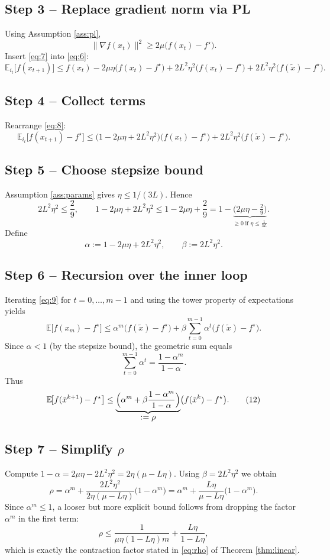 \documentclass[11pt]{article}
\begin{document}
\subsection*{Step 3 – Replace gradient norm via PL}
Using Assumption \ref{ass:pl},
\[
\|\nabla f(x_t)\|^{2}\ge 2\mu\bigl(f(x_t)-f^{\star}\bigr).
\tag{7}
\]
Insert \eqref{eq:7} into \eqref{eq:6}:
\[
\mathbb{E}_{i_t}\!\bigl[f(x_{t+1})\bigr]
\le
f(x_t)-2\mu\eta\bigl(f(x_t)-f^{\star}\bigr)
+2L^{2}\eta^{2}\bigl(f(x_t)-f^{\star}\bigr)
+2L^{2}\eta^{2}\bigl(f(\tilde{x})-f^{\star}\bigr).
\tag{8}
\]

\subsection*{Step 4 – Collect terms}
Rearrange \eqref{eq:8}:
\[
\mathbb{E}_{i_t}\!\bigl[f(x_{t+1})-f^{\star}\bigr]
\le
\bigl(1-2\mu\eta+2L^{2}\eta^{2}\bigr)\bigl(f(x_t)-f^{\star}\bigr)
+2L^{2}\eta^{2}\bigl(f(\tilde{x})-f^{\star}\bigr).
\tag{9}
\]

\subsection*{Step 5 – Choose stepsize bound}
Assumption \ref{ass:params} gives $\eta\le 1/(3L)$.  Hence
\[
2L^{2}\eta^{2}\le\frac{2}{9},\qquad
1-2\mu\eta+2L^{2}\eta^{2}
\le 1-2\mu\eta+\frac{2}{9}
=1-\underbrace{\bigl(2\mu\eta-\tfrac{2}{9}\bigr)}_{\ge0\;\text{if }\eta\le\frac{1}{3L}}.
\]
Define
\[
\alpha:=1-2\mu\eta+2L^{2}\eta^{2},\qquad
\beta:=2L^{2}\eta^{2}.
\tag{10}
\]

\subsection*{Step 6 – Recursion over the inner loop}
Iterating \eqref{eq:9} for $t=0,\dots,m-1$ and using the tower property of
expectations yields
\[
\mathbb{E}\!\bigl[f(x_{m})-f^{\star}\bigr]
\le
\alpha^{m}\bigl(f(\tilde{x})-f^{\star}\bigr)
+\beta\sum_{t=0}^{m-1}\alpha^{t}\bigl(f(\tilde{x})-f^{\star}\bigr).
\tag{11}
\]
Since $\alpha<1$ (by the stepsize bound), the geometric sum equals
\[
\sum_{t=0}^{m-1}\alpha^{t}
=\frac{1-\alpha^{m}}{1-\alpha}.
\]
Thus
\[
\mathbb{E}\!\bigl[f(\tilde{x}^{k+1})-f^{\star}\bigr]
\le
\underbrace{\Bigl(\alpha^{m}
+\beta\frac{1-\alpha^{m}}{1-\alpha}\Bigr)}_{\displaystyle:=\rho}
\bigl(f(\tilde{x}^{k})-f^{\star}\bigr).
\tag{12}
\]

\subsection*{Step 7 – Simplify $\rho$}
Compute $1-\alpha=2\mu\eta-2L^{2}\eta^{2}=2\eta(\mu-L\eta)$.  Using
$\beta=2L^{2}\eta^{2}$ we obtain
\[
\rho
= \alpha^{m}
+ \frac{2L^{2}\eta^{2}}{2\eta(\mu-L\eta)}\bigl(1-\alpha^{m}\bigr)
= \alpha^{m}
+ \frac{L\eta}{\mu-L\eta}\bigl(1-\alpha^{m}\bigr).
\tag{13}
\]
Since $\alpha^{m}\le 1$, a looser but more explicit bound follows from
dropping the factor $\alpha^{m}$ in the first term:
\[
\rho\le
\frac{1}{\mu\eta(1-L\eta)m}
   +\frac{L\eta}{1-L\eta},
\tag{14}
\]
which is exactly the contraction factor stated in \eqref{eq:rho} of Theorem
\ref{thm:linear}.
\end{document}
